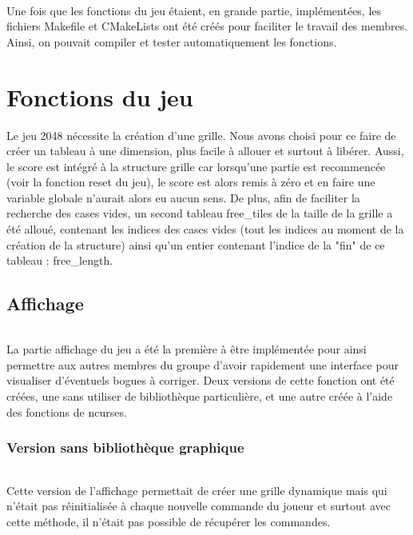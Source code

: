 \documentclass{report}
\begin{document}
\paragraph{}Une fois que les fonctions du jeu étaient, en grande partie, implémentées, les fichiers Makefile et CMakeLists ont été créés pour faciliter le travail des membres. Ainsi, on pouvait compiler et tester automatiquement les fonctions.



\part{Fonctions du jeu}

Le jeu 2048 nécessite la création d'une grille. Nous avons choisi pour ce faire de créer un tableau à une dimension, plus facile à allouer et surtout à libérer. Aussi, le score est intégré à la structure grille car lorsqu'une partie est recommencée (voir la fonction reset du jeu), le score est alors remis à zéro et en faire une variable globale n'aurait alors eu aucun sens. De plus, afin de faciliter la recherche des cases vides, un second tableau free{\_}tiles de la taille de la grille a été alloué, contenant les indices des cases vides (tout les indices au moment de la création de la structure) ainsi qu'un entier contenant l'indice de la "fin" de ce tableau : free{\_}length.

\chapter{Affichage}

\paragraph{}
La partie affichage du jeu a été la première à être implémentée pour ainsi permettre aux autres membres du groupe d'avoir rapidement une interface pour visualiser d'éventuels bogues à corriger. Deux versions de cette fonction ont été créées, une sans utiliser de bibliothèque particulière, et une autre créée à l'aide des fonctions de ncurses.

\section{Version sans bibliothèque graphique}

\paragraph{}
Cette version de l'affichage permettait de créer une grille dynamique mais qui n'était pas réinitialisée à chaque nouvelle commande du joueur et surtout avec cette méthode, il n'était pas possible de récupérer les commandes.
\end{document}
